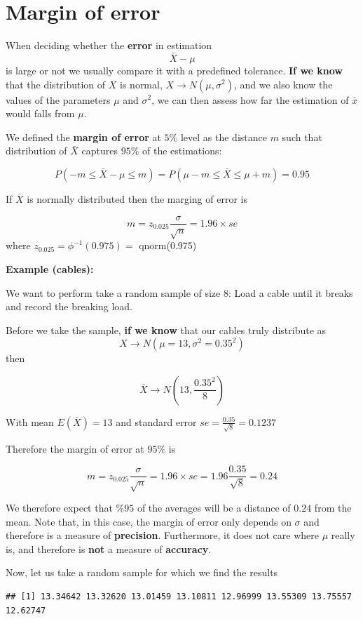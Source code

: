 \documentclass[
]{book}
\begin{document}
\hypertarget{margin-of-error-1}{%
\section{Margin of error}\label{margin-of-error-1}}

When deciding whether the \textbf{error} in estimation \[\bar{X}-\mu\] is large or not we usually compare it with a predefined tolerance. \textbf{If we know} that the distribution of \(X\) is normal, \(X \rightarrow N(\mu, \sigma^2)\), and we also know the values of the parameters \(\mu\) and \(\sigma^2\), we can then assess how far the estimation of \(\bar{x}\) would falls from \(\mu\).

We defined the \textbf{margin of error} at \(5\%\) level as the distance \(m\) such that distribution of \(\bar{X}\) captures \(95\%\) of the estimations:

\[P(-m \leq \bar{X}-\mu \leq m)=P(\mu-m \leq \bar{X} \leq\mu + m)=0.95\]

If \(\bar{X}\) is normally distributed then the marging of error is

\[m=z_{0.025} \frac{\sigma}{\sqrt{n}}=1.96\times se\]
where \(z_{0.025}=\phi^{-1}(0.975)=\) qnorm(0.975)

\textbf{Example (cables):}

We want to perform take a random sample of size \(8\): Load a cable until it breaks and record the breaking load.

Before we take the sample, \textbf{if we know} that our cables truly distribute as \[X \rightarrow N(\mu=13, \sigma^2=0.35^2)\] then

\[\bar{X} \rightarrow N(13, \frac{0.35^2}{8})\]

With mean \(E(\bar{X})=13\) and standard error \(se=\frac{0.35}{\sqrt{8}}=0.1237\)

Therefore the margin of error at \(95\%\) is

\[m=z_{0.025} \frac{\sigma}{\sqrt{n}}=1.96\times se=1.96\frac{0.35}{\sqrt{8}}=0.24\]

We therefore expect that \(\%95\) of the averages will be a distance of \(0.24\) from the mean. Note that, in this case, the margin of error only depends on \(\sigma\) and therefore is a measure of \textbf{precision}. Furthermore, it does not care where \(\mu\) really is, and therefore is \textbf{not} a measure of \textbf{accuracy}.

Now, let us take a random sample for which we find the results

\begin{verbatim}
## [1] 13.34642 13.32620 13.01459 13.10811 12.96999 13.55309 13.75557 12.62747
\end{verbatim}
\end{document}
